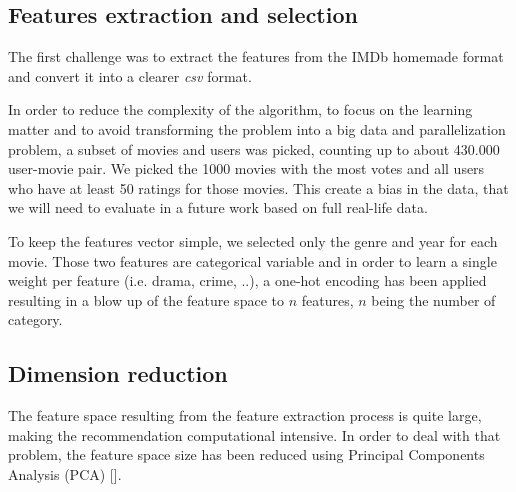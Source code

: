 \documentclass[letterpaper]{article}
\begin{document}
\subsection{Features extraction and selection}

The first challenge was to extract the features from the IMDb homemade format and convert it into a clearer \textit{csv} format.

In order to reduce the complexity of the algorithm, to focus on the learning matter and to avoid transforming the problem into a big data and parallelization problem, a subset of movies and users was picked, counting up to about 430.000 user-movie pair. We picked the 1000 movies with the most votes and all users who have at least 50 ratings for those movies. This create a bias in the data, that we will need to evaluate in a future work based on full real-life data.

To keep the features vector simple, we selected only the genre and year for each movie. Those two features are categorical variable and in order to learn a single weight per feature (i.e. drama, crime, ..), a one-hot encoding has been applied resulting in a blow up of the feature space to $n$ features, $n$ being the number of category.

\begin{table}[h]
\vskip 0.25cm
\caption{Movies feature space}
\end{table}


\subsection{Dimension reduction}

The feature space resulting from the feature extraction process is quite large, making the recommendation computational intensive.
In order to deal with that problem, the feature space size has been reduced using Principal Components Analysis (PCA) [\cite{principalcompanalysis}].
\end{document}
